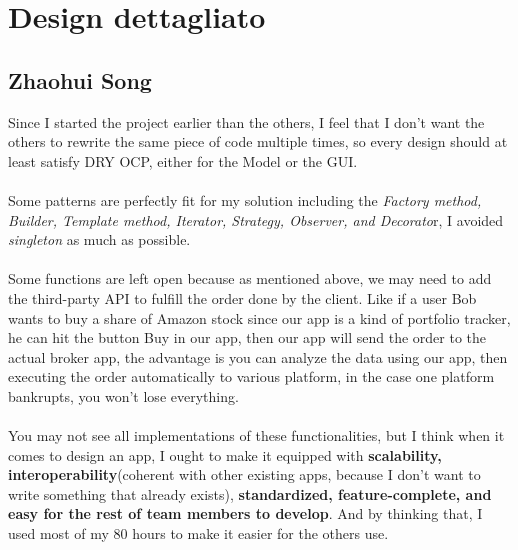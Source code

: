 \documentclass[a4paper,12pt]{report}
\begin{document}


\section{Design dettagliato}

\subsection{Zhaohui Song}

Since I started the project earlier than the others, I feel that I don't want the others to rewrite the same piece of code multiple times, so every design should at least satisfy DRY OCP, either for the Model or the GUI.
%
\\\\Some patterns are perfectly fit for my solution including the \textit{Factory method, Builder, Template method, Iterator, Strategy, Observer, and Decorato}r, I avoided \textit{singleton} as much as possible.
%
\\\\Some functions are left open because as mentioned above, we may need to add the third-party API to fulfill the order done by the client. Like if a user Bob wants to buy a share of Amazon stock since our app is a kind of portfolio tracker,  
he can hit the button Buy in our app, then our app will send the order to the actual broker app, the advantage is you can analyze the data using our app, then executing the order automatically to various platform, in the case one platform bankrupts, you won't lose everything.
%
\\\\You may not see all implementations of these functionalities, but I think when it comes to design an app, I ought to make it equipped with  \textbf{scalability,  interoperability}(coherent with other existing apps, because I don't want to write something that already exists), \textbf{standardized, feature-complete, and easy for the rest of team members to develop}.
And by thinking that, I used most of my 80 hours to make it easier for the others use.
%
\end{document}
